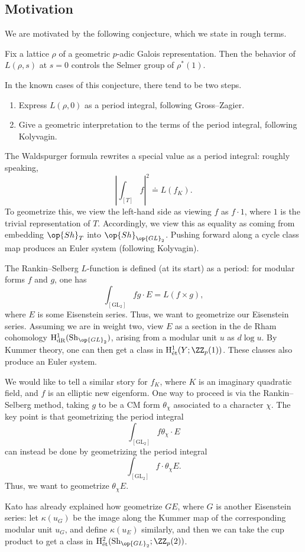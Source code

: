 \documentclass{article}
\begin{document}
\subsection{Motivation}
We are motivated by the following conjecture, which we state in rough terms.
\begin{conj}
	Fix a lattice $\rho$ of a geometric $p$-adic Galois representation. Then the behavior of $L(\rho,s)$ at $s=0$ controls the Selmer group of $\rho^*(1)$.
\end{conj}
In the known cases of this conjecture, there tend to be two steps.
\begin{enumerate}
	\item Express $L(\rho,0)$ as a period integral, following Gross--Zagier.
	\item Give a geometric interpretation to the terms of the period integral, following Kolyvagin.
\end{enumerate}
\begin{example}
	The Waldspurger formula rewrites a special value as a period integral: roughly speaking,
	\[\left|\int_{[T]}f\right|^2\doteq L(f_K).\]
	To geometrize this, we view the left-hand side as viewing $f$ as $f\cdot1$, where $1$ is the trivial representation of $T$. Accordingly, we view this as equality as coming from embedding $\op{Sh}_T$ into $\op{Sh}_{\op{GL}_2}$. Pushing forward along a cycle class map produces an Euler system (following Kolyvagin).
\end{example}
\begin{example}
	The Rankin--Selberg $L$-function is defined (at its start) as a period: for modular forms $f$ and $g$, one has
	\[\int_{[\mathrm{GL}_2]}fg\cdot E=L(f\times g),\]
	where $E$ is some Eisenstein series. Thus, we want to geometrize our Eisenstein series. Assuming we are in weight two, view $E$ as a section in the de Rham cohomology $\mathrm H^1_{\mathrm{dR}}(\mathrm{Sh}_{\op{GL}_2})$, arising from a modular unit $u$ as $d\log u$. By Kummer theory, one can then get a class in $\mathrm H^1_{\mathrm{\acute et}}(Y;\ZZ_p(1))$. These classes also produce an Euler system.
\end{example}
We would like to tell a similar story for $f_K$, where $K$ is an imaginary quadratic field, and $f$ is an elliptic new eigenform. One way to proceed is via the Rankin--Selberg method, taking $g$ to be a CM form $\theta_\chi$ associated to a character $\chi$. The key point is that geometrizing the period integral
\[\int_{[\mathrm{GL}_2]}f\theta_\chi\cdot E\]
can instead be done by geometrizing the period integral
\[\int_{[\mathrm{GL}_2]}f\cdot\theta_\chi E.\]
Thus, we want to geometrize $\theta_\chi E$.
\begin{remark}
	Kato has already explained how geometrize $GE$, where $G$ is another Eisenstein series: let $\kappa(u_G)$ be the image along the Kummer map of the corresponding modular unit $u_G$, and define $\kappa(u_E)$ similarly, and then we can take the cup product to get a class in $\mathrm H^2_{\mathrm{\acute et}}(\mathrm{Sh}_{\op{GL}_2};\ZZ_p(2))$.
\end{remark}
\end{document}
